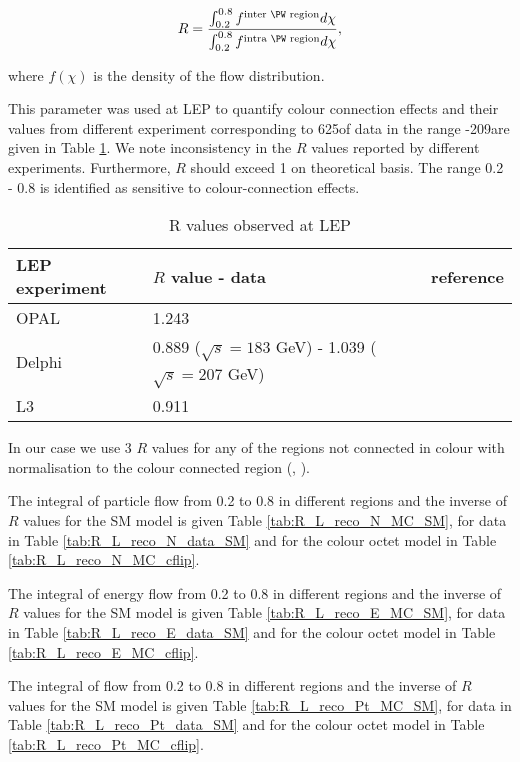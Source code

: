 \begin{equation}
R=\frac{\int_{0.2}^{0.8}f^{\text{inter \PW region}}d\chi}{\int_{0.2}^{0.8}f^{\text{intra \PW region}}d\chi},
\end{equation}

where $f(\chi)$ is the density of the flow distribution.

This parameter was used at LEP to quantify colour connection effects and their values from different experiment corresponding to 625\pbinv of data in the range -209\GeV are given in Table \ref{tab:LEP_R}. We note inconsistency in the $R$ values reported by different experiments. Furthermore,  $R$ should exceed 1 on theoretical basis. The range 0.2 - 0.8 is identified as sensitive to colour-connection effects. 
\begin{table}
\centering
\begin{tabular}{lll}
LEP experiment & $R$ value - data                                        & reference\\
\hline
    OPAL       & 1.243                                                   & \cite{Abbiendi:2005es}\\
    Delphi     & 0.889 ($\sqrt{s}=183$ GeV) - 1.039 ($\sqrt{s}=207$ GeV) & \cite{Abdallah:2006uq}\\
    L3         & 0.911                                                   & \cite{Achard:2003pe}\\
  \end{tabular}
\caption{R values observed at LEP}
\label{tab:LEP_R}
\end{table} 

In our case we use 3 $R$ values for any of the regions not connected in colour with normalisation to the colour connected region (\leadingjet, \scndleadingjet).

The integral of particle flow from 0.2 to 0.8 in different regions and the inverse of $R$ values for the SM model is given Table \ref{tab:R_L_reco_N_MC_SM}, for data in Table \ref{tab:R_L_reco_N_data_SM} and for the \PW colour octet model in Table \ref{tab:R_L_reco_N_MC_cflip}.

The integral of energy flow from 0.2 to 0.8 in different regions and the inverse of $R$ values for the SM model is given Table \ref{tab:R_L_reco_E_MC_SM}, for data in Table \ref{tab:R_L_reco_E_data_SM} and for the \PW colour octet model in Table \ref{tab:R_L_reco_E_MC_cflip}.

The integral of \pt flow from 0.2 to 0.8 in different regions and the inverse of $R$ values for the SM model is given Table \ref{tab:R_L_reco_Pt_MC_SM}, for data in Table \ref{tab:R_L_reco_Pt_data_SM} and for the \PW colour octet model in Table \ref{tab:R_L_reco_Pt_MC_cflip}.


